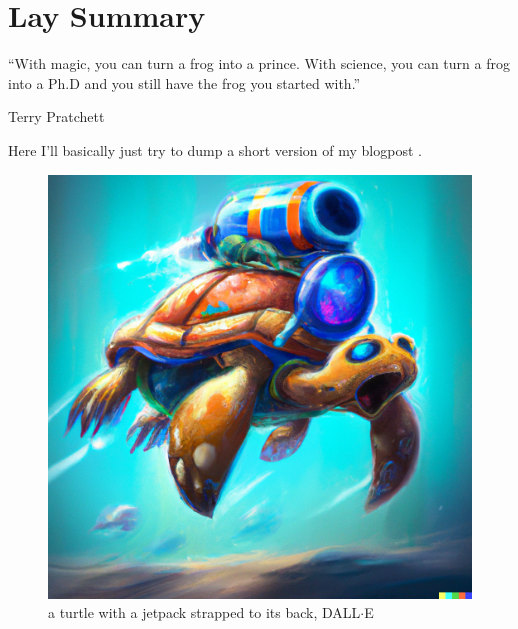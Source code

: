 \chapter{Lay Summary}
\epigraph{“With magic, you can turn a frog into a prince. With science, you can turn a frog into a Ph.D and you still have the frog you started with.”}{Terry Pratchett}

Here I'll basically just try to dump a short version of my blogpost \cite{cepaite_cold_2023}. 
\begin{figure}
\centering
\includegraphics[width=0.9\linewidth]{images/COLD_turle.png} \caption[DALL$\cdot$E turtle]{a turtle with a jetpack strapped to its back, DALL$\cdot$E}\label{fig:COLD_TURTLE}
\end{figure}

